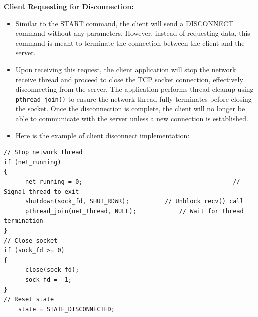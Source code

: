 \textbf{Client Requesting for Disconnection:}
\begin{itemize}
\item Similar to the START command, the client will send a DISCONNECT command without any parameters. However, instead of requesting data, this command is meant to terminate the connection between the client and the server.
\item Upon receiving this request, the client application will stop the network receive thread and proceed to close the TCP socket connection, effectively disconnecting from the server. The application performs thread cleanup using \texttt{pthread\_join()} to ensure the network thread fully terminates before closing the socket. Once the disconnection is complete, the client will no longer be able to communicate with the server unless a new connection is established.
\item Here is the example of client disconnect implementation:
\end{itemize}
\begin{verbatim}
// Stop network thread
if (net_running)
{
      net_running = 0;                                          // Signal thread to exit
      shutdown(sock_fd, SHUT_RDWR);          // Unblock recv() call
      pthread_join(net_thread, NULL);            // Wait for thread termination
}
// Close socket
if (sock_fd >= 0)
{
      close(sock_fd);
      sock_fd = -1;
}
// Reset state
    state = STATE_DISCONNECTED;
\end{verbatim}

